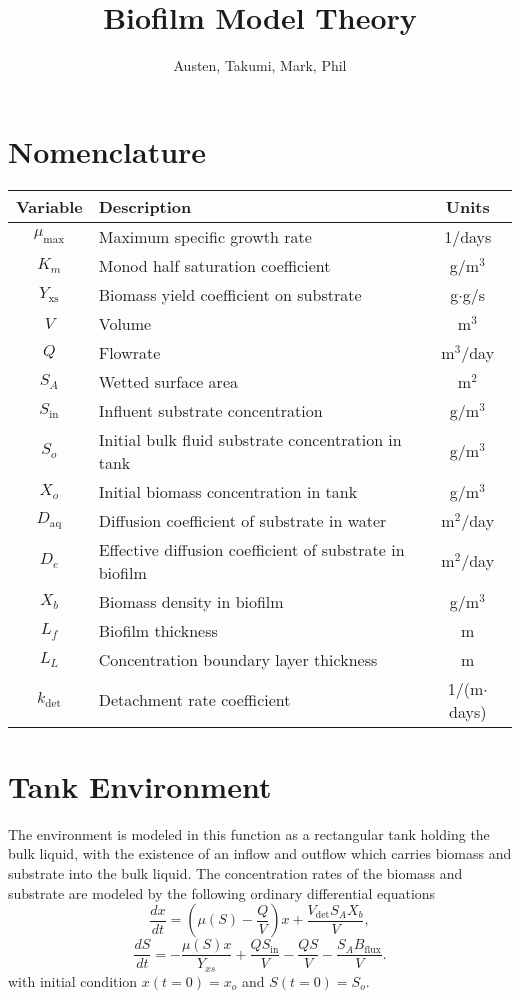 \documentclass[letterpaper, twoside]{article}
\title{Biofilm Model Theory}
\author{Austen, Takumi, Mark, Phil}
\date{}
\begin{document}
\maketitle
{}

\section{Nomenclature}
\begin{tabular}{c l c}
  Variable & Description & Units\\ \hline
  $\mu_\mathrm{max}$  & Maximum specific growth rate & 1/days\\
  $K_m$ & Monod half saturation coefficient & g/m$^3$\\
  $Y_\mathrm{xs}$ & Biomass yield coefficient on substrate & g$\cdot$g/s\\
  $V$ & Volume &m$^3$ \\
  $Q$	& Flowrate & m$^3$/day\\
  $S_A$	& Wetted surface area & m$^2$\\
  $S_{\mathrm{in}}$ & Influent substrate concentration &  g/m$^3$ \\
  $S_o$ & Initial bulk fluid substrate concentration in tank &  g/m$^3$ \\
  $X_o$ & Initial biomass concentration in tank &  g/m$^3$ \\
  $D_\mathrm{aq}$ & Diffusion coefficient of substrate in water & m$^2$/day \\
  $D_e$ & Effective diffusion coefficient of substrate in biofilm & m$^2$/day \\
  $X_b$ & Biomass density in biofilm &  g/m$^3$ \\
  $L_{f}$ & Biofilm thickness & m\\
  $L_L$ & Concentration boundary layer thickness & m \\
  $k_\mathrm{det}$ &	Detachment rate coefficient & 1/(m$\cdot$days)
\end{tabular}

\section{Tank Environment}
The environment is modeled in this function as a rectangular tank holding the bulk liquid, with the existence of an inflow and outflow which carries biomass and substrate into the bulk liquid. The concentration rates of the biomass and substrate are modeled by the following ordinary differential equations
\begin{equation} \label{eq: BiomassEquation}
  \frac{dx}{dt} = \left(\mu(S) - \frac{Q}{V}\right) x +\frac{ V_{\mathrm{det}} S_A X_b}{V},
\end{equation}
\begin{equation} \label{eq: SubstrateEquation}
  \frac{dS}{dt} = -\frac{\mu(S) x}{Y_{xs}} + \frac{Q S_{\mathrm{in}}}{V} - \frac{Q S}{V} - \frac{S_A B_{\mathrm{flux}}}{V}.
\end{equation}
with initial condition $x(t=0)=x_o$ and $S(t=0)=S_o$.
\end{document}
